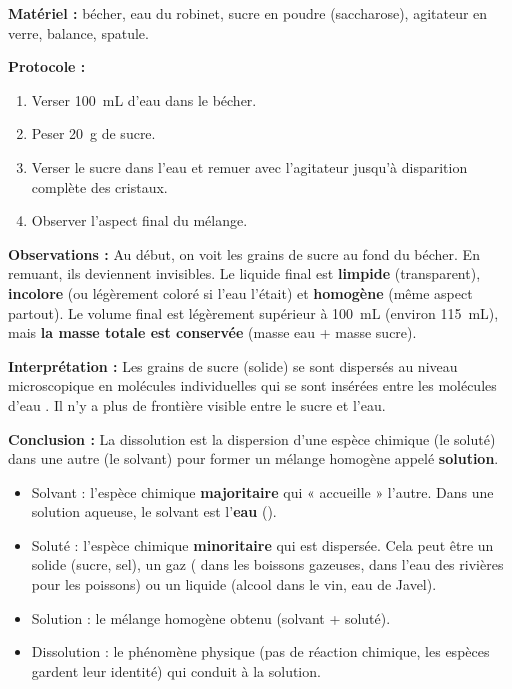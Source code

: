 \documentclass[11pt]{article}
\newcommand{\cle}[1]{{\popxbold\color{popdark}#1}}
\begin{document}
\begin{experience}
\textbf{Matériel :} bécher, eau du robinet, sucre en poudre (saccharose), agitateur en verre, balance, spatule.

\textbf{Protocole :}
\begin{enumerate}
\item Verser \SI{100}{mL} d'eau dans le bécher.
\item Peser \SI{20}{g} de sucre.
\item Verser le sucre dans l'eau et remuer avec l'agitateur jusqu'à disparition complète des cristaux.
\item Observer l'aspect final du mélange.
\end{enumerate}

\textbf{Observations :} Au début, on voit les grains de sucre au fond du bécher. En remuant, ils deviennent invisibles. Le liquide final est \textbf{limpide} (transparent), \textbf{incolore} (ou légèrement coloré si l'eau l'était) et \textbf{homogène} (même aspect partout). Le volume final est légèrement supérieur à \SI{100}{mL} (environ \SI{115}{mL}), mais \textbf{la masse totale est conservée} (masse eau + masse sucre).

\textbf{Interprétation :} Les grains de sucre (solide) se sont dispersés au niveau microscopique en molécules individuelles  qui se sont insérées entre les molécules d'eau . Il n'y a plus de frontière visible entre le sucre et l'eau.

\textbf{Conclusion :} La dissolution est la dispersion d'une espèce chimique (le soluté) dans une autre (le solvant) pour former un mélange homogène appelé \textbf{solution}.
\end{experience}

\begin{definition}
\begin{itemize}
\item \cle{Solvant} : l'espèce chimique \textbf{majoritaire} qui « accueille » l'autre. Dans une solution aqueuse, le solvant est l'\textbf{eau} ().
\item \cle{Soluté} : l'espèce chimique \textbf{minoritaire} qui est dispersée. Cela peut être un solide (sucre, sel), un gaz ( dans les boissons gazeuses,  dans l'eau des rivières pour les poissons) ou un liquide (alcool dans le vin, eau de Javel).
\item \cle{Solution} : le mélange homogène obtenu (solvant + soluté).
\item \cle{Dissolution} : le phénomène physique (pas de réaction chimique, les espèces gardent leur identité) qui conduit à la solution.
\end{itemize}
\end{definition}
\end{document}
